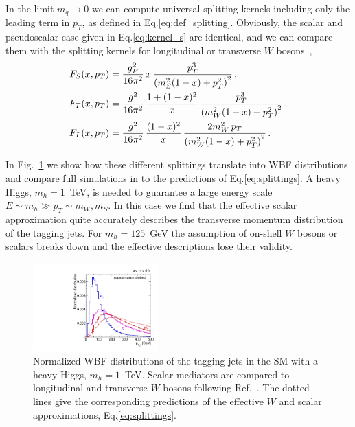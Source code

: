 In the limit $m_q \to 0$ we can compute universal splitting kernels
including only the leading term in $p_T$, as defined in
Eq.\;\eqref{eq:def_splitting}.  Obviously, the scalar and pseudoscalar
case given in Eq.\;\eqref{eq:kernel_s} are identical, and we can compare
them with the splitting kernels for longitudinal or transverse
$W$ bosons~\cite{effective_w},
%
\begin{align}
  F_S(x,p_T) &= \frac {g_F^2} {16 \pi^2} \, x \,
               \frac {p_T^3} {\left( m_S^2 (1-x) + p_T^2 \right)^2} \,,\notag \\
  F_T(x,p_T) &= \frac {g^2} {16 \pi^2} \, \frac {1+(1-x)^2} x \, \frac {p_T^3} {\left( m_W^2 (1-x) + p_T^2 \right)^2} \,, \notag \\
  F_L(x,p_T) &= \frac {g^2} {16 \pi^2} \, \frac {(1-x)^2} x \, \frac {2 m_W^2 \, p_T} {\left( m_W^2 (1-x) + p_T^2 \right)^2} \,.
  \label{eq:splittings}
\end{align}

In Fig.~\ref{fig:validity_effective_scalar} we show how these different
splittings translate into WBF distributions and compare full simulations
in  to the predictions of Eq.\;\eqref{eq:splittings}.
A heavy Higgs, $m_h = 1$~TeV, is needed to guarantee a large energy scale
$E \sim m_h \gg p_T \sim m_W, m_S$. In this case we find that the
effective scalar approximation quite accurately describes the transverse
momentum distribution of the tagging jets. For $m_h = 125$~GeV the
assumption of on-shell $W$ bosons or scalars breaks down and the
effective descriptions lose their validity.

\begin{figure}[t]
  \centering
  \includegraphics[width=0.43\textwidth]{fig/validity/WBF_ESA.pdf}
  \caption{Normalized WBF distributions of the tagging jets in the SM with
  a heavy Higgs, $m_h = 1$~TeV. Scalar mediators are compared to
  longitudinal and transverse $W$ bosons following
  Ref.~\cite{polarized_ww}.
  The dotted lines give the corresponding predictions of the effective
  $W$ and scalar approximations, Eq.\;\eqref{eq:splittings}.}
  \label{fig:validity_effective_scalar}
\end{figure}



